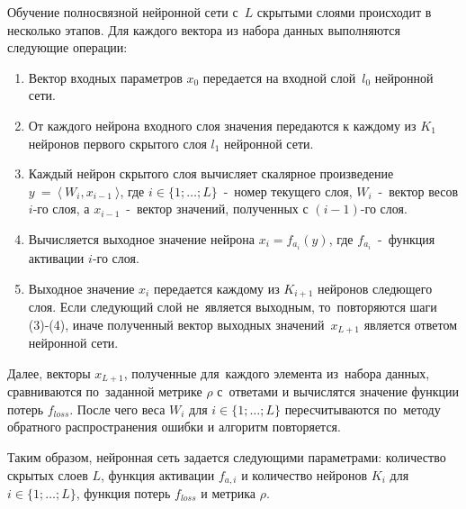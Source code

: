 Обучение полносвязной\cite[с.\,44]{bib:neural_networks} нейронной сети с~$L$ скрытыми слоями\cite[с.\,43]{bib:neural_networks} происходит в несколько этапов. Для каждого вектора из набора данных выполняются следующие операции:
\begin{enumerate}\label{alg:neural_education}
\item Вектор входных параметров $x_0$ передается на входной слой~$l_0$ нейронной сети.
\item От каждого нейрона входного слоя значения передаются к каждому из $K_1$ нейронов первого скрытого слоя $l_1$ нейронной сети.
\item Каждый нейрон скрытого слоя вычисляет скалярное произведение \newline $y~=~\langle~W_i, x_{i-1}~\rangle$, где $i\in\{1; \dots; L\}$~-~номер текущего слоя, $W_i$~-~вектор весов $i$-го слоя, а $x_{i-1}$~-~вектор значений, полученных с $(i-1)$-го слоя.
\item Вычисляется выходное значение нейрона $x_i = f_{a_i}(y)$, где $f_{a_i}$~-~функция активации\cite[с.\,151]{bib:neural_networks2} $i$-го слоя.
\item Выходное значение $x_i$ передается каждому из $K_{i+1}$ нейронов следющего слоя. Если следующий слой не~является выходным, то~повторяются шаги (3)-(4), иначе полученный вектор выходных значений~$x_{L+1}$ является ответом нейронной сети.
\end{enumerate}

\newpage

Далее, векторы $x_{L+1}$, полученные для~каждого элемента из~набора данных, сравниваются по~заданной метрике\cite{bib:metrics} $\rho$ с~ответами
и вычислятся значение функции потерь\cite[с.\,65]{bib:neural_networks2} $f_{loss}$. После чего веса $W_i$ для $i\in\{1; \dots; L\}$ пересчитываются по~методу обратного распространения ошибки\cite[с.\,151-184]{bib:neural_networks2} и алгоритм повторяется.

Таким образом, нейронная сеть задается следующими параметрами: количество скрытых слоев $L$, функция активации $f_{a,i}$ и количество нейронов $K_i$ для $i\in\{1; \dots; L\}$, функция потерь $f_{loss}$ и метрика $\rho$.

